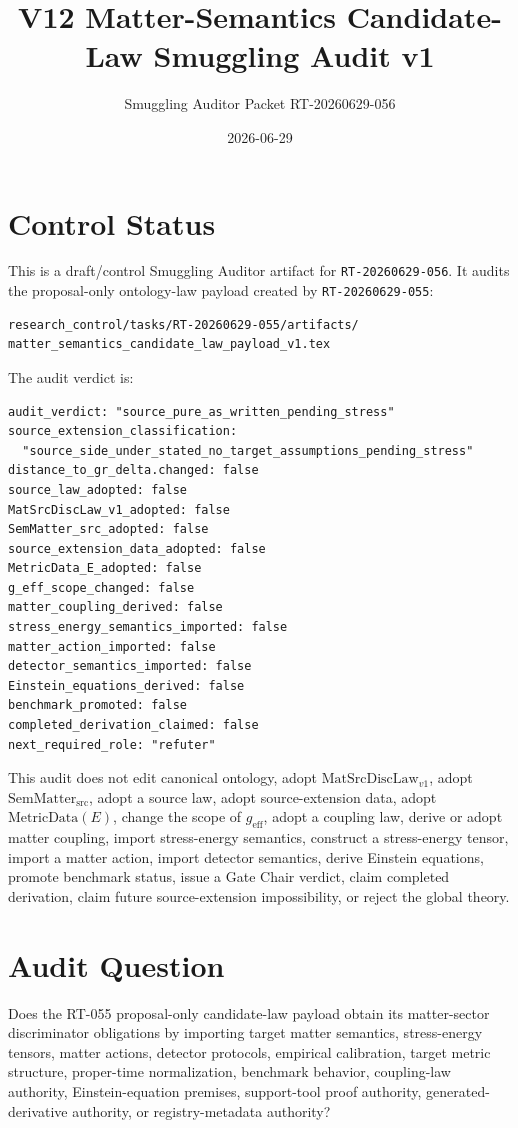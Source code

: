 \documentclass[11pt]{article}
\title{V12 Matter-Semantics Candidate-Law Smuggling Audit v1}
\author{Smuggling Auditor Packet RT-20260629-056}
\date{2026-06-29}
\newcommand{\MetricData}{\mathrm{MetricData}}
\newcommand{\geff}{g_{\mathrm{eff}}}
\newcommand{\MatSrcDiscLaw}{\mathrm{MatSrcDiscLaw}_{v1}}
\newcommand{\SemMatterSrc}{\mathrm{SemMatter}_{\mathrm{src}}}
\begin{document}
\maketitle

\section{Control Status}

This is a draft/control Smuggling Auditor artifact for
\texttt{RT-20260629-056}.  It audits the proposal-only ontology-law payload
created by \texttt{RT-20260629-055}:

\begin{verbatim}
research_control/tasks/RT-20260629-055/artifacts/
matter_semantics_candidate_law_payload_v1.tex
\end{verbatim}

The audit verdict is:

\begin{verbatim}
audit_verdict: "source_pure_as_written_pending_stress"
source_extension_classification:
  "source_side_under_stated_no_target_assumptions_pending_stress"
distance_to_gr_delta.changed: false
source_law_adopted: false
MatSrcDiscLaw_v1_adopted: false
SemMatter_src_adopted: false
source_extension_data_adopted: false
MetricData_E_adopted: false
g_eff_scope_changed: false
matter_coupling_derived: false
stress_energy_semantics_imported: false
matter_action_imported: false
detector_semantics_imported: false
Einstein_equations_derived: false
benchmark_promoted: false
completed_derivation_claimed: false
next_required_role: "refuter"
\end{verbatim}

This audit does not edit canonical ontology, adopt \(\MatSrcDiscLaw\), adopt
\(\SemMatterSrc\), adopt a source law, adopt source-extension data, adopt
\(\MetricData(E)\), change the scope of \(\geff\), adopt a coupling law,
derive or adopt matter coupling, import stress-energy semantics, construct a
stress-energy tensor, import a matter action, import detector semantics,
derive Einstein equations, promote benchmark status, issue a Gate Chair
verdict, claim completed derivation, claim future source-extension
impossibility, or reject the global theory.

\section{Audit Question}

Does the RT-055 proposal-only candidate-law payload obtain its matter-sector
discriminator obligations by importing target matter semantics, stress-energy
tensors, matter actions, detector protocols, empirical calibration, target
metric structure, proper-time normalization, benchmark behavior,
coupling-law authority, Einstein-equation premises, support-tool proof
authority, generated-derivative authority, or registry-metadata authority?
\end{document}
